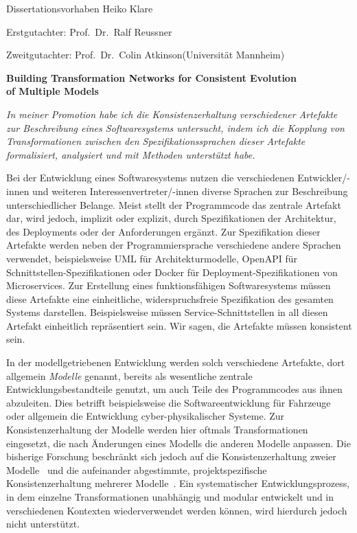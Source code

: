 \documentclass[a4paper,deutsch,CS,11pt,unnummeriert]{KITbrief}
\newcommand{\doktorand}{Heiko Klare}
\newcommand{\disstitle}{Building Transformation Networks for Consistent Evolution \\[0.2em] of Multiple Models}
\newcommand{\referent}{Prof.~Dr.~Ralf Reussner\xspace}
\newcommand{\coreferentshort}{Prof.~Dr.~Colin Atkinson\xspace}
\newcommand{\coreferent}{\coreferentshort(Universität Mannheim)\xspace}
\newcommand\owncite[2][]{%
    \cite[#1]{#2}%
    \addtocategory{ownpublications}{#2}%
}
\begin{document}
{\Large Dissertationsvorhaben \doktorand}

Erstgutachter: \referent

\vspace{-0.35em}
Zweitgutachter: \coreferent

\vspace{0.5em}

\textbf{\Large \disstitle}

\vspace{0.15em}


\emph{In meiner Promotion habe ich die Konsistenzerhaltung verschiedener Artefakte zur Beschreibung eines Softwaresystems untersucht, indem ich die Kopplung von Transformationen zwischen den Spezifikationssprachen dieser Artefakte formalisiert, analysiert und mit Methoden unterstützt habe.}

Bei der Entwicklung eines Softwaresystems nutzen die verschiedenen Entwickler/-innen und weiteren Interessenvertreter/-innen diverse Sprachen zur Beschreibung unterschiedlicher Belange.
Meist stellt der Programmcode das zentrale Artefakt dar, wird jedoch, implizit oder explizit, durch Spezifikationen der Architektur, des Deployments oder der Anforderungen ergänzt.
Zur Spezifikation dieser Artefakte werden neben der Programmiersprache verschiedene andere Sprachen verwendet, beispielsweise UML für Architekturmodelle, OpenAPI für Schnittstellen-Spezifikationen oder Docker für Deployment-Spezifikationen von Microservices.
Zur Erstellung eines funktionsfähigen Softwaresystems müssen diese Artefakte eine einheitliche, widerspruchsfreie Spezifikation des gesamten Systems darstellen.
Beispielsweise müssen Service-Schnittstellen in all diesen Artefakt einheitlich repräsentiert sein.
Wir sagen, die Artefakte müssen konsistent sein.

In der modellgetriebenen Entwicklung werden solch verschiedene Artefakte, dort allgemein \emph{Modelle} genannt, bereits als wesentliche zentrale Entwicklungsbestandteile genutzt, um auch Teile des Programmcodes aus ihnen abzuleiten.
Dies betrifft beispielsweise die Softwareentwicklung für Fahrzeuge~\owncite{guissouma2018study,sax2017survey} oder allgemein die Entwicklung cyber-physikalischer Systeme.
Zur Konsistenzerhaltung der Modelle werden hier oftmals Transformationen eingesetzt, die nach Änderungen eines Modells die anderen Modelle anpassen.
Die bisherige Forschung beschränkt sich jedoch auf die Konsistenzerhaltung zweier Modelle~\cite{stevens2020BidirectionalTransformationLarge-SoSym} und die aufeinander abgestimmte, projektspezifische Konsistenzerhaltung mehrerer Modelle~\cite{cleve2019dagstuhl,diskin2018MultiModelSynchronization-FASE}.
Ein systematischer Entwicklungsprozess, in dem einzelne Transformationen unabhängig und modular entwickelt und in verschiedenen Kontexten wiederverwendet werden können, wird hierdurch jedoch nicht unterstützt.
\end{document}
